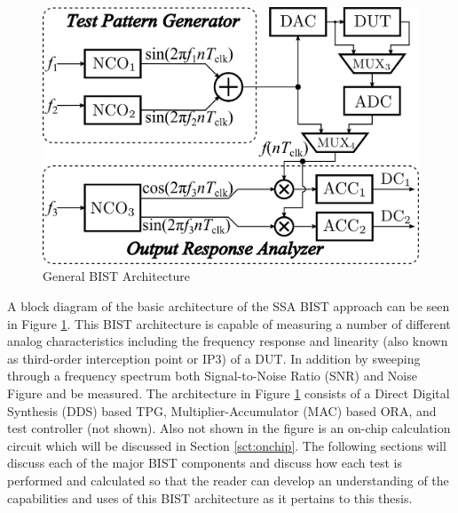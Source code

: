 \documentclass[12pt]{report}
\begin{document}
\begin{figure}
	\begin{center}
		\includegraphics[scale=.5]{images/bist-ssa-architecture}
	\end{center}
	\caption{General BIST Architecture\cite{testtime}}
	\label{fig:bist-ssa}
\end{figure}
A block diagram of the basic architecture of the SSA BIST approach can be seen in Figure \ref{fig:bist-ssa}.  This BIST architecture is capable of measuring a number of different analog characteristics including the frequency response and linearity (also known as third-order interception point or IP3) of a DUT\cite{basessa}.  In addition by sweeping through a frequency spectrum both Signal-to-Noise Ratio (SNR) and Noise Figure\cite{noisefigure} and be measured.  The architecture in Figure \ref{fig:bist-ssa} consists of a Direct Digital Synthesis (DDS) based TPG, Multiplier-Accumulator (MAC) based ORA, and test controller (not shown).  Also not shown in the figure is an on-chip calculation circuit which will be discussed in Section \ref{sct:onchip}.  The following sections will discuss each of the major BIST components and discuss how each test is performed and calculated so that the reader can develop an understanding of the capabilities and uses of this BIST architecture as it pertains to this thesis.
\end{document}
